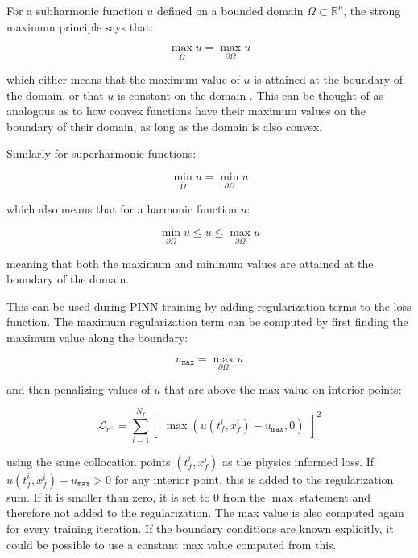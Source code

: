 For a subharmonic function $u$ defined on a bounded domain $\Omega \subset \mathbb{R}^n$, the strong maximum principle says that:

\begin{equation}
    \max_{\overline{\Omega}} u = \max_{\partial \Omega} u
\end{equation}

\noindent which either means that the maximum value of $u$ is attained at the boundary of the domain, or that $u$ is constant on the domain \cite{pdebookcourse}. This can be thought of as analogous as to how convex functions have their maximum values on the boundary of their domain, as long as the domain is also convex.

Similarly for superharmonic functions:

\begin{equation}
    \min_{\overline{\Omega}} u = \min_{\partial \Omega} u
\end{equation}

\noindent which also means that for a harmonic function $u$:

\begin{equation}
    \min_{\partial \Omega} u \leq u \leq \max_{\partial \Omega} u
\end{equation}

\noindent meaning that both the maximum and minimum values are attained at the boundary of the domain.

This can be used during PINN training by adding regularization terms to the loss function. The maximum regularization term can be computed by first finding the maximum value along the boundary:

\begin{equation}
    u_{\texttt{max}} = \max_{\partial \Omega} u
\end{equation}

\noindent and then penalizing values of $u$ that are above the max value on interior points:

\begin{equation}
    \mathcal{L}_{r^+} = \sum_{i=1}^{N_f} \begin{bmatrix} \max(u(t_f^i, x_f^i) - u_{\texttt{max}}, 0) \end{bmatrix}^2
\end{equation}

\noindent using the same collocation points $(t_f^i, x_f^i)$ as the physics informed loss. If $u(t_f^i, x_f^i) - u_{\texttt{max}} > 0$ for any interior point, this is added to the regularization sum. If it is smaller than zero, it is set to 0 from the $\max$ statement and therefore not added to the regularization. The max value is also computed again for every training iteration. If the boundary conditions are known explicitly, it could be possible to use a constant max value computed from this.

